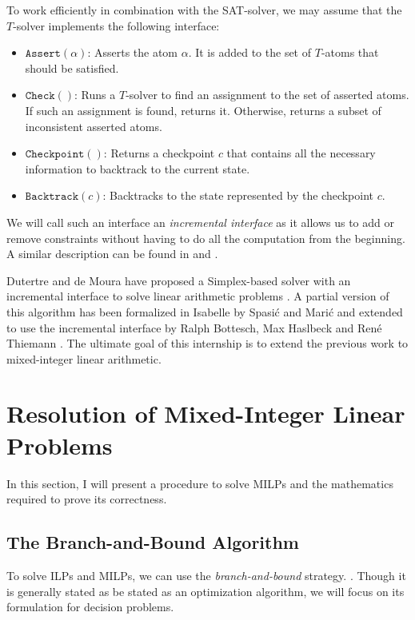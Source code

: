 \documentclass{article}
\newcommand{\iassert}[1]{\mathtt{Assert}(#1)}
\newcommand{\icheck}{\mathtt{Check}()}
\newcommand{\icheckpoint}{\mathtt{Checkpoint}()}
\newcommand{\ibacktrack}[1]{\mathtt{Backtrack}(#1)}
\begin{document}
To work efficiently in combination with the SAT-solver, we may assume that the
$T$-solver implements the following interface:
\begin{itemize}
  \item $\iassert{\alpha}$: Asserts the atom $\alpha$. It is added to the set of
    $T$-atoms that should be satisfied.
  \item $\icheck$: Runs a $T$-solver to find an assignment to the set of
    asserted atoms. If such an assignment is found, returns it. Otherwise,
    returns a subset of inconsistent asserted atoms.
  \item $\icheckpoint$: Returns a checkpoint $c$ that contains all the necessary
    information to backtrack to the current state.
  \item $\ibacktrack{c}$: Backtracks to the state represented by the checkpoint
    $c$.
\end{itemize}

We will call such an interface an \textit{incremental interface} as it allows
us to add or remove constraints without having to do all the computation from
the beginning. A similar description can be found in \cite{Dutertre2006} and
\cite{Thiemann2018,BHT2019}.

Dutertre and de Moura have proposed a Simplex-based solver with an incremental
interface to solve linear arithmetic problems
\cite{Dutertre2006}. A partial version of this algorithm has been
formalized in Isabelle by Spasić and Marić \cite{Spasic2012} and extended to
use the incremental interface by Ralph Bottesch, Max Haslbeck and René Thiemann
\cite{Thiemann2018,BHT2019}. The ultimate goal of this internship is to extend
the previous work to mixed-integer linear arithmetic.

\section{Resolution of Mixed-Integer Linear Problems}
In this section, I will present a procedure to solve MILPs and the
mathematics required to prove its correctness.

\subsection{The Branch-and-Bound Algorithm}
\label{bbdescr}
To solve ILPs and MILPs, we can use the \textit{branch-and-bound} strategy.
\cite[Section 5.3]{Decision2016}. Though it is generally stated as
be stated as an optimization algorithm, we will focus on its formulation for
decision problems.
\end{document}
